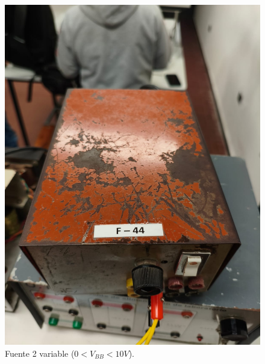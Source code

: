 \documentclass[chaptersright]{informeutn}
\begin{document}
\begin{figure}[H]
\begin{minipage}{0.40\textwidth}
          \includegraphics[width=\textwidth]{pictures/fuente2.jpeg}
          \caption{Fuente 2 variable ($0< V_{BB}<10V$).}
          \label{fig:fuente2}
        \end{minipage}
        \begin{minipage}{0.40\textwidth}
          \centering

\end{minipage}
\end{figure}
\end{document}
